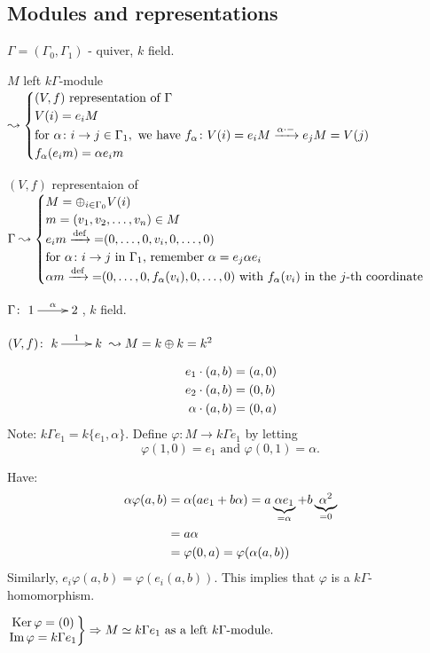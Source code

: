 \subsection{Modules and representations}

$\Gamma = (\Gamma_0,\Gamma_1)$ - quiver, $k$ field.

$M$ left $k\Gamma$-module $\leadsto\begin{cases}
(V,f) \text{\ representation of $\Gamma$}\\
V(i) = e_iM\\
\text{for\ } \alpha\colon i\to j \in \Gamma_1, \text{\ we have\ }  f_\alpha\colon
V(i)=e_iM\extto{\alpha\cdot -} e_jM = V(j)\\
f_\alpha(e_im) = \alpha e_im
\end{cases}$

$(V,f)$ representaion of $\Gamma\leadsto \begin{cases}
M = \oplus_{i\in\Gamma_0} V(i)\\
m = (v_1,v_2,\ldots, v_n) \in M\\
e_im \xrightarrow{\text{def}}{=} (0,\ldots,0,v_i,0,\ldots,0)\\
\text{for $\alpha\colon i\to j$ in $\Gamma_1$, remember $\alpha =
  e_j\alpha e_i$}\\
\alpha m \xrightarrow{\text{def}}{=} (0,\ldots,0,f_\alpha(v_i),0,\ldots,0)
\text{\ with $f_\alpha(v_i)$ in the $j$-th coordinate}
\end{cases}$

\begin{exam}
$\Gamma\colon \xymatrix{1\ar[r]^\alpha & 2}$, $k$ field.

$(V,f)\colon \xymatrix{k\ar[r]^1 & k} \leadsto M = k\oplus k = k^2$

\begin{align}
e_1\cdot (a,b) & = (a, 0)\notag\\
e_2\cdot (a,b) & = (0,b)\notag\\
\alpha\cdot(a,b) & = (0,a)\notag
\end{align}
Note: $k\Gamma e_1 = k\{ e_1,\alpha\}$.  Define $\varphi\colon M\to
k\Gamma e_1$ by letting 
\[\varphi(1,0) = e_1 \text{\ and\ } \varphi(0,1) = \alpha.\]

Have: 
\begin{align}
\alpha \varphi(a,b)  & = \alpha(ae_1 + b\alpha) =
a\underbrace{\alpha e_1}_{=\alpha} +
                       b\underbrace{\alpha^2}_{=0}\notag\\
& = a\alpha\notag\\
& = \varphi(0,a) = \varphi(\alpha(a,b))\notag
\end{align} 
Similarly, $e_i\varphi(a,b) = \varphi(e_i(a,b))$. This implies that
$\varphi$ is a $k\Gamma$-homomorphism.\medskip 

$\left.\begin{matrix}
\operatorname{Ker}\nolimits \varphi = (0)\\
\operatorname{Im}\nolimits\varphi = k\Gamma e_1
\end{matrix}\right\} \Rightarrow M\simeq k\Gamma e_1 \text{\ as a left $k\Gamma$-module}.$
\end{exam}

